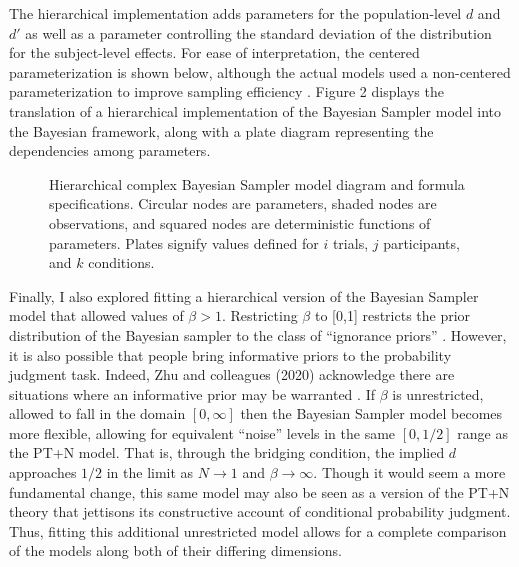 \documentclass[
  man,floatsintext]{apa6}
\begin{document}
The hierarchical implementation adds parameters for the population-level \(d\) and \(d'\) as well as a parameter controlling the standard deviation of the distribution for the subject-level effects. For ease of interpretation, the centered parameterization is shown below, although the actual models used a non-centered parameterization to improve sampling efficiency \autocite{papaspiliopoulos.etal2007}. Figure 2 displays the translation of a hierarchical implementation of the Bayesian Sampler model into the Bayesian framework, along with a plate diagram representing the dependencies among parameters.

\begin{figure}
  \begin{minipage}{.5\textwidth}
    \flushright
    
  \end{minipage}%
  \begin{minipage}{.5\textwidth}
    \flushleft
    \small
    
  \end{minipage}
  \caption{Hierarchical complex Bayesian Sampler model diagram and formula specifications. Circular nodes are parameters, shaded nodes are observations, and squared nodes are deterministic functions of parameters. Plates signify values defined for $i$ trials, $j$ participants, and $k$ conditions.}
\end{figure}

Finally, I also explored fitting a hierarchical version of the Bayesian Sampler model that allowed values of \(\beta > 1\). Restricting \(\beta\) to {[}0,1{]} restricts the prior distribution of the Bayesian sampler to the class of ``ignorance priors'' \autocite{zhu.etal2020}. However, it is also possible that people bring informative priors to the probability judgment task. Indeed, Zhu and colleagues (2020) acknowledge there are situations where an informative prior may be warranted \autocite[see e.g.,][]{fennell.baddeley2012}. If \(\beta\) is unrestricted, allowed to fall in the domain \([0, \infty]\) then the Bayesian Sampler model becomes more flexible, allowing for equivalent ``noise'' levels in the same \([0, 1/2]\) range as the PT+N model. That is, through the bridging condition, the implied \(d\) approaches \(1/2\) in the limit as \(N \to 1\) and \(\beta \to \infty\). Though it would seem a more fundamental change, this same model may also be seen as a version of the PT+N theory that jettisons its constructive account of conditional probability judgment. Thus, fitting this additional unrestricted model allows for a complete comparison of the models along both of their differing dimensions.
\end{document}
